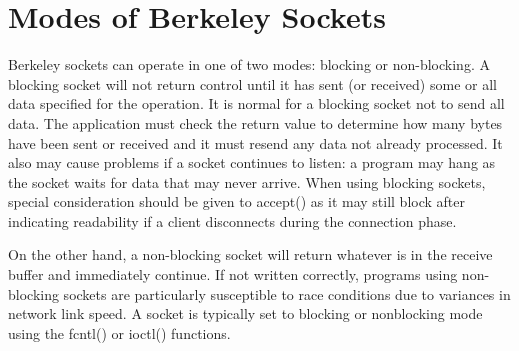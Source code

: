 \section{Modes of Berkeley Sockets}
Berkeley sockets can operate in one of two modes: blocking or non-blocking.
A blocking socket will not return control until it has sent (or received) some or all data specified for the operation. It is normal for a blocking socket not to send all data. The application must check the return value to determine how many bytes have been sent or received and it must resend any data not already processed. It also may cause problems if a socket continues to listen: a program may hang as the socket waits for data that may never arrive. When using blocking sockets, special consideration should be given to accept() as it may still block after indicating readability if a client disconnects during the connection phase.

On the other hand, a non-blocking socket will return whatever is in the receive buffer and immediately continue. If not written correctly, programs using non-blocking sockets are particularly susceptible to race conditions due to variances in network link speed.
A socket is typically set to blocking or nonblocking mode using the fcntl() or ioctl() functions.